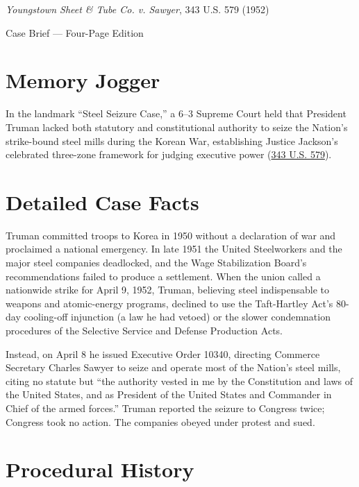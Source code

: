 \documentclass[12pt]{article}
\begin{document}
\begin{center}
{\LARGE \textit{Youngstown Sheet \& Tube Co. v. Sawyer}, 343 U.S. 579 (1952)\par}
\vspace{0.8em}
{\large Case Brief --- Four-Page Edition\par}
\end{center}
\vspace{1em}

\section{Memory Jogger}

In the landmark ``Steel Seizure Case,'' a 6--3 Supreme Court held that President Truman lacked both statutory and constitutional authority to seize the Nation's strike-bound steel mills during the Korean War, establishing Justice Jackson's celebrated three-zone framework for judging executive power (\href{https://supreme.justia.com/cases/federal/us/343/579/}{343 U.S. 579}).

\section{Detailed Case Facts}

Truman committed troops to Korea in 1950 without a declaration of war and proclaimed a national emergency. In late 1951 the United Steelworkers and the major steel companies deadlocked, and the Wage Stabilization Board's recommendations failed to produce a settlement. When the union called a nationwide strike for April 9, 1952, Truman, believing steel indispensable to weapons and atomic-energy programs, declined to use the Taft-Hartley Act's 80-day cooling-off injunction (a law he had vetoed) or the slower condemnation procedures of the Selective Service and Defense Production Acts.

Instead, on April 8 he issued Executive Order 10340, directing Commerce Secretary Charles Sawyer to seize and operate most of the Nation's steel mills, citing no statute but ``the authority vested in me by the Constitution and laws of the United States, and as President of the United States and Commander in Chief of the armed forces.'' Truman reported the seizure to Congress twice; Congress took no action. The companies obeyed under protest and sued.

\section{Procedural History}
\end{document}
